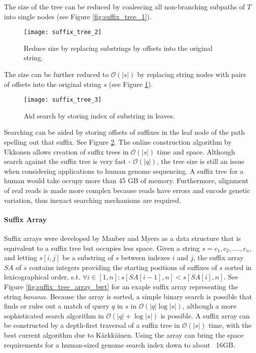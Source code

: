 The size of the tree can be reduced by coalescing all non-branching subpaths of $T$ into single nodes (see Figure \ref{fig:suffix_tree_1}). 

\begin{figure}[H]
    \texttt{[image: suffix\_tree\_2]}
    \centering
    \caption {Reduce size by replacing substrings by offsets into the original string.\autocite{langmead_teaching}}
    \label{fig:suffix_tree_2}
\end{figure}

The size can be further reduced to $\mathcal{O}(|s|)$ by replacing string nodes with pairs of offsets into the original string $s$ (see Figure \ref{fig:suffix_tree_2}).

\begin{figure}[H]
    \texttt{[image: suffix\_tree\_3]}
    \centering
    \caption {Aid search by storing index of substring in leaves.\autocite{langmead_teaching}}
    \label{fig:suffix_tree_3}
\end{figure}

Searching can be aided by storing offsets of suffixes in the leaf node of the path spelling out that suffix. See Figure \ref{fig:suffix_tree_3}. The online construction algorithm by Ukkonen\autocite{ukkonen1995line} allows creation of suffix trees in $\mathcal{O}(|s|)$ time and space. Although search against the suffix tree is very fast - $\mathcal{O}(|q|)$, the tree size is still an issue when considering applications to human genome sequencing. A suffix tree for a human would take occupy more than 45 GB of memory\autocite{langmead_teaching}. Furthermore, alignment of real reads is made more complex because reads have errors and encode genetic variation, thus inexact searching mechanisms are required.

\paragraph{Suffix Array}

Suffix arrays were developed by Manber and Myers\autocite{manber1993suffix} as a data structure that is equivalent to a suffix tree but occupies less space. Given a string $s = c_1,c_2,....,c_n$, and letting $s[i,j]$ be a substring of $s$ between indexes $i$ and $j$, the suffix array $SA$ of $s$ contains integers providing the starting positions of suffixes of $s$ sorted in lexicographical order, s.t. $\forall i \in [1,n]: s[SA[i-1],n] < s[SA[i],n]$. See Figure \ref{fig:suffix_tree_array_bwt} for an exaple suffix array representing the string $banana$. Because the array is sorted, a simple binary search is possible that finds or rules out a match of query $q$ in $s$ in $\mathcal{O}(|q|\log{|s|})$, although a more sophisticated search algorithm in $\mathcal{O}(|q| + \log{|s|})$ is possible\autocite{manber1993suffix}. A suffix array can be constructed by a depth-first traversal of a suffix tree in $\mathcal{O}(|s|)$ time, with the best current algorithm due to Kärkkäinen\autocite{karkkainen2003simple}. Using the array can bring the space requirements for a human-sized genome search index down to about ~16GB\autocite{langmead_teaching}.


